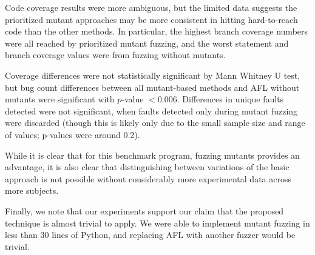 Code coverage results were more ambiguous, but the limited data
suggests the prioritized mutant approaches may be more consistent in
hitting hard-to-reach code than the other methods.  In particular, the highest branch coverage numbers were all reached by prioritized mutant fuzzing, and the worst statement and branch coverage values were from fuzzing without mutants.

Coverage differences were not statistically significant by Mann
Whitney U test, but bug count differences between all mutant-based methods and AFL
without mutants were significant with $p$-value $< 0.006$.
Differences in unique faults detected were not significant, when
faults detected only during mutant fuzzing were discarded (though this
is likely only due to the small sample size and range of values;
p-values were around 0.2).

While it is clear that for this benchmark program, fuzzing mutants
provides an advantage, it is also clear that distinguishing between
variations of the basic approach is not possible without considerably
more experimental data across more subjects.

Finally, we note that our experiments support our claim that the proposed technique is almost trivial to apply. We were able to implement mutant fuzzing in less than 30 lines of Python, and replacing AFL with another fuzzer would be trivial.
